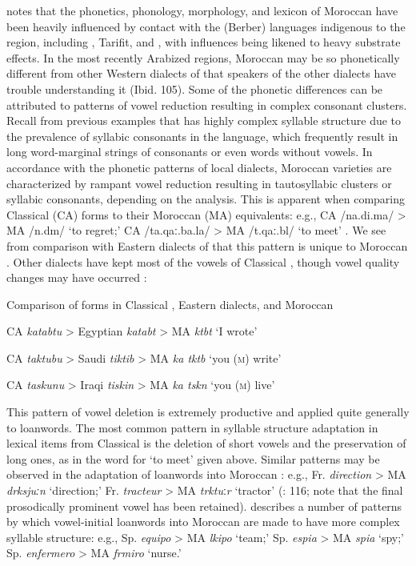  \citet{Chtatou1997} notes that the phonetics, phonology, morphology, and lexicon of Moroccan  have been heavily influenced by contact with the  (Berber) languages indigenous to the region, including , Tarifit, and , with influences being likened to heavy substrate effects. In the most recently Arabized regions, Moroccan  may be so phonetically different from other Western dialects of  that speakers of the other dialects have trouble understanding it (Ibid. 105). Some of the phonetic differences can be attributed to patterns of vowel reduction resulting in complex consonant clusters. Recall from previous examples that  has highly complex syllable structure due to the prevalence of syllabic consonants in the language, which frequently result in long word-marginal strings of consonants or even words without vowels. In accordance with the phonetic patterns of local  dialects, Moroccan  varieties are characterized by rampant vowel reduction resulting in tautosyllabic clusters or syllabic consonants, depending on the analysis. This is apparent when comparing Classical  (CA) forms to their Moroccan  (MA) equivalents: e.g., CA /na.di.ma/ > MA /n.dm/ ‘to regret;’ CA /ta.qaː.ba.la/ > MA /t.qaː.bl/ ‘to meet’ \citep[110]{Chtatou1997}. We see from comparison with Eastern dialects of  that this pattern is unique to Moroccan . Other dialects have kept most of the vowels of Classical , though vowel quality changes may have occurred :

\ea\label{ex:8.5}
  Comparison of forms in Classical , Eastern dialects, and Moroccan 

  CA \textit{katabtu} > Egyptian  \textit{katabt} > MA \textit{ktbt} ‘I wrote’ 

  CA \textit{taktubu} > Saudi  \textit{tiktib} > MA \textit{ka tktb} ‘you (\textsc{m}) write’

  CA \textit{taskunu} > Iraqi  \textit{tiskin} > MA \textit{ka tskn} ‘you (\textsc{m}) live’
\citep[111-12]{Chtatou1997}
\z

This pattern of vowel deletion is extremely productive and applied quite generally to loanwords. The most common pattern in syllable structure adaptation in lexical items from Classical  is the deletion of short vowels and the preservation of long ones, as in the word for ‘to meet’ given above. Similar patterns may be observed in the adaptation of  loanwords into Moroccan : e.g., Fr. \textit{direction} > MA \textit{drksjuːn} ‘direction;’ Fr. \textit{tracteur} > MA \textit{trktu}ː\textit{r} ‘tractor’ (\citealt{Chatou1997}: 116; note that the final prosodically prominent vowel has been retained). \citet{Sayahi2005} describes a number of patterns by which vowel-initial  loanwords into Moroccan  are made to have more complex syllable structure: e.g., Sp. \textit{equipo} > MA \textit{lkipo} ‘team;’ Sp. \textit{espia} > MA \textit{spia} ‘spy;’ Sp. \textit{enfermero} > MA \textit{frmiro} ‘nurse.’

